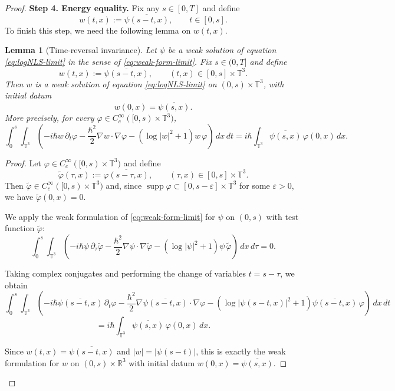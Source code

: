 \documentclass[11pt]{article}
\newtheorem{lemma}{Lemma}
\begin{document}
\begin{proof}
\noindent
\textbf{Step 4. Energy equality.}
Fix any $s\in [0,T]$ and define
\[
w(t,x):=\overline{\psi(s-t,x)}, \qquad t\in [0,s].
\]
To finish this step, we need the following lemma on $w(t,x)$.
\begin{lemma}[Time-reversal invariance]
\label{Time-reversal invariance}
Let $\psi$ be a weak solution of equation \eqref{eq:logNLS-limit}
in the sense of \eqref{eq:weak-form-limit}.  Fix $s\in (0,T]$ and define
\[
w(t,x):=\overline{\psi(s-t,x)}, \qquad (t,x)\in [0,s]\times \mathbb{T}^3.
\]
Then $w$ is a weak solution of  equation \eqref{eq:logNLS-limit}
 on $(0,s)\times \mathbb{T}^3$, with initial datum
\[
w(0,x)=\overline{\psi(s,x)}.
\]
More precisely, for every $\varphi\in C_c^\infty([0,s)\times \mathbb{T}^3)$,
\[
\int_0^s \int_{\mathbb{T}^3}
\left(
-i\hbar w\,\partial_t\varphi
-\frac{\hbar^2}{2}\nabla w\cdot \nabla \varphi
-(\log |w|^2+1)w\,\varphi
\right)\,dx\,dt
=
i\hbar \int_{\mathbb{T}^3} \overline{\psi(s,x)}\,\varphi(0,x)\,dx.
\]
\end{lemma}

\begin{proof}
Let $\varphi\in C_c^\infty([0,s)\times \mathbb{T}^3)$ and define
\[
\widetilde{\varphi}(\tau,x):=\overline{\varphi(s-\tau,x)},
\qquad (\tau,x)\in [0,s]\times \mathbb{T}^3.
\]
Then $\widetilde{\varphi}\in C_c^\infty([0,s)\times \mathbb{T}^3)$ and, since
$\operatorname{supp}\varphi \subset [0,s-\varepsilon]\times \mathbb{T}^3$ for some $\varepsilon>0$,
we have $\widetilde{\varphi}(0,x)=0$.

We apply the weak formulation of  \eqref{eq:weak-form-limit} for $\psi$ on $(0,s)$ with test function
$\widetilde{\varphi}$:
\[
\int_0^s \int_{\mathbb{T}^3}
\left(
-i\hbar \psi\,\partial_\tau \widetilde{\varphi}
-\frac{\hbar^2}{2}\nabla \psi\cdot \nabla \widetilde{\varphi}
-(\log |\psi|^2+1)\psi\,\widetilde{\varphi}
\right)\,dx\,d\tau
=0.
\]

Taking complex conjugates and performing the change of variables $t=s-\tau$, we obtain
\[
\int_0^s \int_{\mathbb{T}^3}
\left(
-i\hbar \overline{\psi(s-t,x)}\,\partial_t\varphi
-\frac{\hbar^2}{2}\nabla \overline{\psi(s-t,x)}\cdot \nabla \varphi
-(\log |\psi(s-t,x)|^2+1)\overline{\psi(s-t,x)}\,\varphi
\right)\,dx\,dt
\]
\[
=
i\hbar \int_{\mathbb{T}^3} \overline{\psi(s,x)}\,\varphi(0,x)\,dx.
\]

Since $w(t,x)=\overline{\psi(s-t,x)}$ and $|w|=|\psi(s-t)|$, this is exactly the weak formulation
for $w$ on $(0,s)\times \mathbb{R}^3$ with initial datum $w(0,x)=\overline{\psi(s,x)}$.
\end{proof}




\end{proof}
\end{document}

